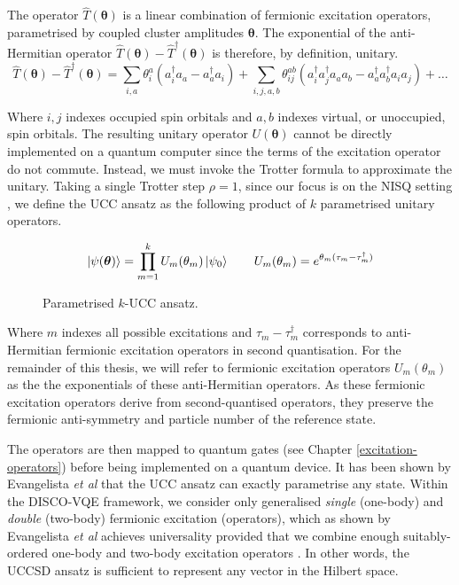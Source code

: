 The operator $\hat T(\bm\theta)$ is a linear combination of fermionic excitation operators, parametrised by coupled cluster amplitudes $\bm\theta$. The exponential of the anti-Hermitian operator $\hat T(\bm\theta) - \hat T^\dagger(\bm\theta)$ is therefore, by definition, unitary. 
\begin{equation*}
\hat T(\bm{\theta}) - \hat T^{\dagger}(\bm{\theta}) =
\sum_{i, a} \theta^a_i (a^\dagger_i a_a - a^\dagger_a a_i) + 
\sum_{i, j, a, b} \theta^{ab}_{ij} (a^\dagger_i a^\dagger_j a_a a_b - a^\dagger_a a^\dagger_b a_i a_j) + \dots
\end{equation*}

Where $i, j$ indexes occupied spin orbitals and $a, b$ indexes virtual, or unoccupied, spin orbitals. The resulting unitary operator $U(\bm\theta)$ cannot be directly implemented on a quantum computer since the terms of the excitation operator do not commute. Instead, we must invoke the Trotter formula to approximate the unitary. Taking a single Trotter step $\rho=1$, since our focus is on the NISQ setting \cite{Cowtan2020}, we define the UCC ansatz as the following product of $k$ parametrised unitary operators.

\begin{figure}[H]
    \centering
    \begin{equation*}
        \ket{\psi(\bm\theta)} = \prod_{m=1}^k U_m(\theta_m) \ket{\psi_0} \qquad
        U_m(\theta_m) = e^{\theta_m (\tau_m - \tau_m^\dagger)}
    \end{equation*}
    \caption{Parametrised $k$-UCC ansatz.}
\end{figure}

Where $m$ indexes all possible excitations and $\tau_m - \tau_m^\dagger$ corresponds to anti-Hermitian fermionic excitation operators in second quantisation. For the remainder of this thesis, we will refer to fermionic excitation operators $U_m(\theta_m)$ as the the exponentials of these anti-Hermitian operators. As these fermionic excitation operators derive from second-quantised operators, they preserve the fermionic anti-symmetry and particle number of the reference state.

The operators are then mapped to quantum gates (see Chapter \ref{excitation-operators}) before being implemented on a quantum device. It has been shown by Evangelista \textit{et al} \cite{Evangelista2019} that the UCC ansatz can exactly parametrise any state. Within the DISCO-VQE framework, we consider only generalised \textit{single} (one-body) and \textit{double } (two-body) fermionic excitation (operators), which as shown by Evangelista \textit{et al} \cite{Evangelista2019} achieves universality provided that we combine enough suitably-ordered one-body and two-body excitation operators \cite{Burton2023}. In other words, the UCCSD ansatz is sufficient to represent any vector in the Hilbert space.

